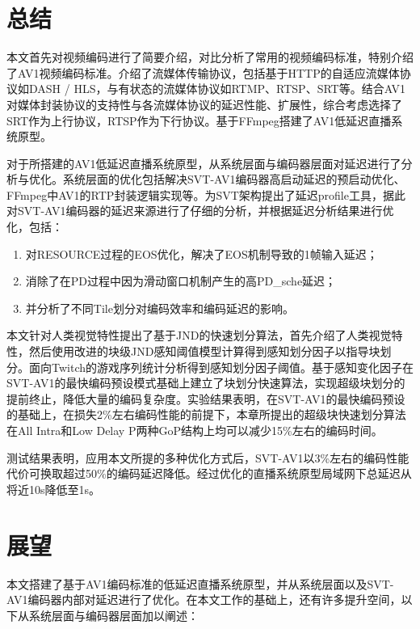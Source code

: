 
\begin{summary}

  \section{总结}
  本文首先对视频编码进行了简要介绍，对比分析了常用的视频编码标准，特别介绍了AV1视频编码标准。介绍了流媒体传输协议，包括基于HTTP的自适应流媒体协议如DASH / HLS，与有状态的流媒体协议如RTMP、RTSP、SRT等。结合AV1对媒体封装协议的支持性与各流媒体协议的延迟性能、扩展性，综合考虑选择了SRT作为上行协议，RTSP作为下行协议。基于FFmpeg搭建了AV1低延迟直播系统原型。

  对于所搭建的AV1低延迟直播系统原型，从系统层面与编码器层面对延迟进行了分析与优化。系统层面的优化包括解决SVT-AV1编码器高启动延迟的预启动优化、FFmpeg中AV1的RTP封装逻辑实现等。为SVT架构提出了延迟profile工具，据此对SVT-AV1编码器的延迟来源进行了仔细的分析，并根据延迟分析结果进行优化，包括：
  \begin{enumerate}
  	\item 对RESOURCE过程的EOS优化，解决了EOS机制导致的1帧输入延迟；
  	\item 消除了在PD过程中因为滑动窗口机制产生的高PD\_sche延迟；
  	\item 并分析了不同Tile划分对编码效率和编码延迟的影响。
  \end{enumerate}

  本文针对人类视觉特性提出了基于JND的快速划分算法，首先介绍了人类视觉特性，然后使用改进的块级JND感知阈值模型计算得到感知划分因子以指导块划分。面向Twitch的游戏序列统计分析得到感知划分因子阈值。基于感知变化因子在SVT-AV1的最快编码预设模式基础上建立了块划分快速算法，实现超级块划分的提前终止，降低大量的编码复杂度。实验结果表明，在SVT-AV1的最快编码预设的基础上，在损失2\%左右编码性能的前提下，本章所提出的超级块快速划分算法在All Intra和Low Delay P两种GoP结构上均可以减少15\%左右的编码时间。

	测试结果表明，应用本文所提的多种优化方式后，SVT-AV1以3\%左右的编码性能代价可换取超过50\%的编码延迟降低。经过优化的直播系统原型局域网下总延迟从将近10s降低至1s。

	\section{展望}
	本文搭建了基于AV1编码标准的低延迟直播系统原型，并从系统层面以及SVT-AV1编码器内部对延迟进行了优化。在本文工作的基础上，还有许多提升空间，以下从系统层面与编码器层面加以阐述：


\end{summary}
